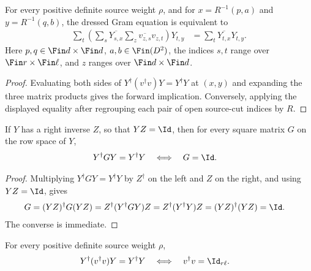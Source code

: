 \begin{lemma}
    \label{thm:mpu_source_v_dressed_entries}
    \leanok
    For every positive definite source weight $\rho$, and for
    $x=R^{-1}(p,a)$ and $y=R^{-1}(q,b)$, the dressed Gram equation is
    equivalent to
    \begin{align}
        \sum_t\left(\sum_s\overline{Y_{s,x}}
        \sum_z\overline{v_{z,s}}v_{z,t}\right)Y_{t,y}
         & =\sum_t\overline{Y_{t,x}}Y_{t,y}.
    \end{align}
    Here $p,q\in\Fin d\times\Fin d$, $a,b\in\Fin(D^2)$, the indices $s,t$
    range over $\Fin r\times\Fin\ell$, and $z$ ranges over
    $\Fin d\times\Fin d$.
\end{lemma}

\begin{proof}
    \leanok
    Evaluating both sides of $Y^\dagger(v^\dagger v)Y=Y^\dagger Y$ at
    $(x,y)$ and expanding the three matrix products gives the forward implication. Conversely, applying the
    displayed equality after regrouping each pair of open source-cut indices
    by $R$.
\end{proof}

\begin{lemma}
    \label{thm:mpu_dressed_gram_cancel}
    \leanok
    If $Y$ has a right inverse $Z$, so that $YZ=\Id$, then for every square
    matrix $G$ on the row space of $Y$,
    \begin{align}
        Y^\dagger GY=Y^\dagger Y
         & \quad\Longleftrightarrow\quad G=\Id.
    \end{align}
\end{lemma}

\begin{proof}
    \leanok
    Multiplying $Y^\dagger GY=Y^\dagger Y$ by $Z^\dagger$ on the left and $Z$ on the right,
    and using $YZ=\Id$, gives
    \begin{align}
        G & = (YZ)^\dagger G (YZ) = Z^\dagger (Y^\dagger GY) Z = Z^\dagger (Y^\dagger Y) Z = (YZ)^\dagger (YZ) = \Id.
    \end{align}
    The converse is immediate.
\end{proof}

\begin{lemma}
    \label{thm:mpu_source_v_dressed_gram_cancel}
    \leanok
    For every positive definite source weight $\rho$,
    \begin{align}
        Y^\dagger(v^\dagger v)Y=Y^\dagger Y
         & \quad\Longleftrightarrow\quad v^\dagger v=\Id_{r\ell}.
    \end{align}
\end{lemma}

